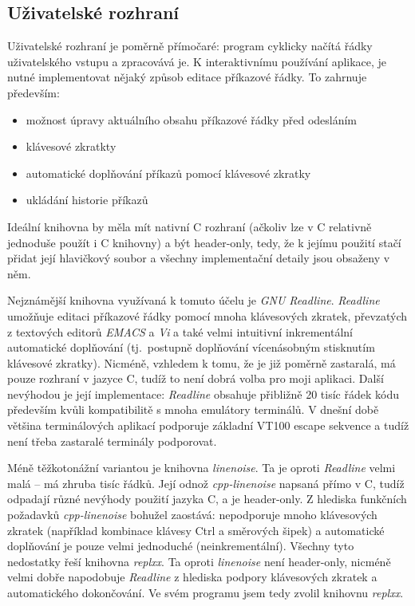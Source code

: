\documentclass[thesis=B,czech]{FITthesis}[2019/03/06]
\newcommand{\Rplus}{\protect\hspace{-.1em}\protect\raisebox{.35ex}{\smaller{\smaller\textbf{+}}}}
\newcommand{\Cpp}{\mbox{C\Rplus\Rplus}\xspace}
\begin{document}
\subsection{Uživatelské rozhraní}
Uživatelské rozhraní je poměrně přímočaré: program cyklicky načítá řádky uživatelského vstupu a zpracovává je. K interaktivnímu používání aplikace, je nutné implementovat nějaký způsob editace příkazové řádky. To zahrnuje především:
\begin{itemize}
    \item možnost úpravy aktuálního obsahu příkazové řádky před odesláním
    \item klávesové zkratkty 
    \item automatické doplňování příkazů pomocí klávesové zkratky
    \item ukládání historie příkazů
\end{itemize}
Ideální knihovna by měla mít nativní \Cpp{} rozhraní (ačkoliv lze v \Cpp{} relativně jednoduše použít i C knihovny) a být header-only, tedy, že k jejímu použití stačí přidat její hlavičkový soubor a všechny implementační detaily jsou obsaženy v něm.

Nejznámější knihovna využívaná k tomuto účelu je \textit{GNU Readline}. \textit{Readline} umožňuje editaci příkazové řádky pomocí mnoha klávesových zkratek, převzatých z textových editorů \textit{EMACS} a \textit{Vi} a také velmi intuitivní inkrementální automatické doplňování (tj.\ postupně doplňování vícenásobným stisknutím klávesové zkratky). Nicméně, vzhledem k tomu, že je již poměrně zastaralá, má pouze rozhraní v jazyce C, tudíž to není dobrá volba pro moji aplikaci. Další nevýhodou je její implementace: \textit{Readline} obsahuje přibližně 20 tisíc řádek kódu především kvůli kompatibilitě s mnoha emulátory terminálů. V dnešní době většina terminálových aplikací podporuje základní VT100 escape sekvence a tudíž není třeba zastaralé terminály podporovat.

Méně těžkotonážní variantou je knihovna \textit{linenoise}. Ta je oproti \textit{Readline} velmi malá -- má zhruba tisíc řádků. Její odnož \textit{cpp-linenoise} napsaná přímo v \Cpp{}, tudíž odpadají různé nevýhody použití jazyka C, a je header-only. Z hlediska funkčních požadavků \textit{cpp-linenoise} bohužel zaostává: nepodporuje mnoho klávesových zkratek (například kombinace klávesy Ctrl a směrových šipek) a automatické doplňování je pouze velmi jednoduché (neinkrementální).  Všechny tyto nedostatky řeší knihovna \textit{replxx}. Ta oproti \textit{linenoise} není header-only, nicméně velmi dobře napodobuje \textit{Readline} z hlediska podpory klávesových zkratek a automatického dokončování. Ve svém programu jsem tedy zvolil knihovnu \textit{replxx}.
\end{document}
